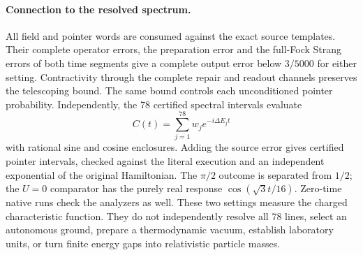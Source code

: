 \paragraph{Connection to the resolved spectrum.}
All field and pointer words are consumed against the exact source
templates.  Their complete operator errors, the preparation error and
the full-Fock Strang errors of both time segments give a complete output
error below $3/5000$ for either setting.  Contractivity through the
complete repair and readout channels preserves the telescoping bound.
The same bound controls each unconditioned pointer probability.
Independently, the 78 certified spectral intervals evaluate
\[
C(t)=\sum_{j=1}^{78}w_j e^{-i\Delta E_jt}
\]
with rational sine and cosine enclosures.  Adding the source error gives
certified pointer intervals, checked against the literal execution and
an independent exponential of the original Hamiltonian.  The
$\pi/2$ outcome is separated from $1/2$; the $U=0$ comparator has the
purely real response $\cos(\sqrt3t/16)$.  Zero-time native runs check the
analyzers as well.  These two settings measure the charged characteristic
function.  They do not independently resolve all 78 lines, select an
autonomous ground, prepare a thermodynamic vacuum, establish laboratory
units, or turn finite energy gaps into relativistic particle masses.
